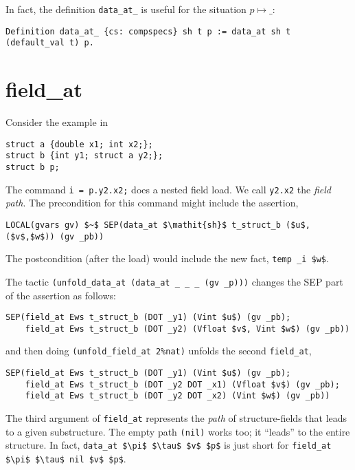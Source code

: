 \documentclass[12pt,fleqn,openany,oneside,showtrims]{memoir}
\begin{document}
In fact, the definition \lstinline{data_at_} is useful
for the situation $p \mapsto \_$:

\begin{lstlisting}
Definition data_at_ {cs: compspecs} sh t p := data_at sh t (default_val t) p.
\end{lstlisting}

\chapter{\upshape field\_at}
\label{refcard:field-at}
\label{refcard:nested-load} %

Consider the example in 
\begin{lstlisting}
struct a {double x1; int x2;};
struct b {int y1; struct a y2;};
struct b p;
\end{lstlisting}
The command  \lstinline{i = p.y2.x2;} does a nested field load.
We call \lstinline{y2.x2} the \emph{field path}.
The precondition for this command might include the assertion,
\begin{lstlisting}
LOCAL(gvars gv) $~$ SEP(data_at $\mathit{sh}$ t_struct_b ($u$,($v$,$w$)) (gv _pb))
\end{lstlisting}
The postcondition (after the load) would include the new \LOCAL{} fact,
\lstinline{temp _i $w$}.

The tactic \lstinline{(unfold_data_at (data_at _ _ _ (gv _p)))}
\label{refcard:unfold-data-at}
changes the SEP part of the assertion as follows:
\begin{lstlisting}
SEP(field_at Ews t_struct_b (DOT _y1) (Vint $u$) (gv _pb);
    field_at Ews t_struct_b (DOT _y2) (Vfloat $v$, Vint $w$) (gv _pb))
\end{lstlisting}
and then doing \lstinline{(unfold_field_at 2%nat)}
unfolds the second \lstinline{field_at},
\begin{lstlisting}
SEP(field_at Ews t_struct_b (DOT _y1) (Vint $u$) (gv _pb);
    field_at Ews t_struct_b (DOT _y2 DOT _x1) (Vfloat $v$) (gv _pb);
    field_at Ews t_struct_b (DOT _y2 DOT _x2) (Vint $w$) (gv _pb))
\end{lstlisting}
The third argument of \lstinline{field_at} represents
the \emph{path} of structure-fields that leads to a given
substructure.  The empty path \lstinline{(nil)}
works too; it ``leads'' to the entire structure.
In fact,
\lstinline{data_at $\pi$ $\tau$ $v$ $p$} is just short for
\lstinline{field_at $\pi$ $\tau$ nil $v$ $p$}.
\end{document}
